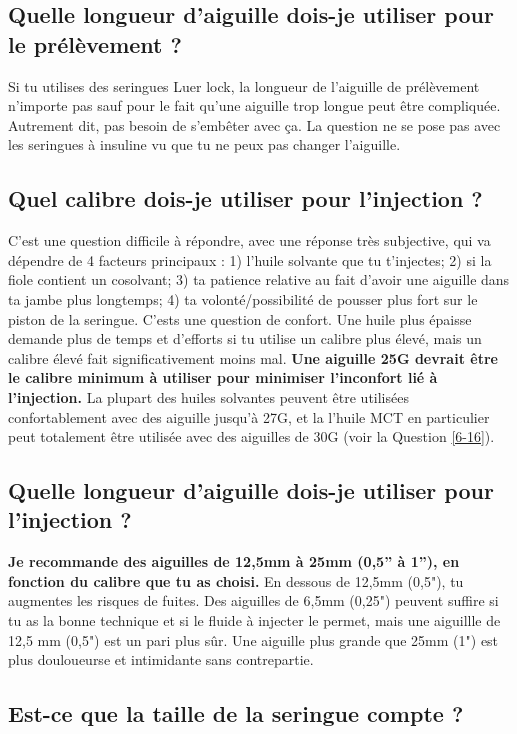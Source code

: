 \documentclass{article}
\begin{document}
\subsection{Quelle longueur d'aiguille dois-je utiliser pour le prélèvement ?}

Si tu utilises des seringues Luer lock, la longueur de l'aiguille de prélèvement n'importe pas sauf pour le fait qu'une aiguille trop longue peut être compliquée. Autrement dit, pas besoin de s'embêter avec ça. La question ne se pose pas avec les seringues à insuline vu que tu ne peux pas changer l'aiguille.

\subsection{Quel calibre dois-je utiliser pour l'injection ?}\label{5-16}

C'est une question difficile à répondre, avec une réponse très subjective, qui va dépendre de 4 facteurs principaux : 1) l'huile solvante que tu t'injectes; 2) si la fiole contient un cosolvant; 3) ta patience relative au fait d'avoir une aiguille dans ta jambe plus longtemps; 4) ta volonté/possibilité de pousser plus fort sur le piston de la seringue. C'ests une question de confort. Une huile plus épaisse demande plus de temps et d'efforts si tu utilise un calibre plus élevé, mais un calibre élevé fait significativement moins mal. \textbf{Une aiguille 25G devrait être le calibre minimum à utiliser pour minimiser l'inconfort lié à l'injection.} La plupart des huiles solvantes peuvent être utilisées confortablement avec des aiguille jusqu'à 27G, et la l'huile MCT en particulier peut totalement être utilisée avec des aiguilles de 30G (voir la Question \ref{6-16}).

\subsection{Quelle longueur d'aiguille dois-je utiliser pour l'injection ?}\label{5-17}

\textbf{Je recommande des aiguilles de 12,5mm à 25mm (0,5” à 1”), en fonction du calibre que tu as choisi.} En dessous de 12,5mm (0,5"), tu augmentes les risques de fuites. Des aiguilles de 6,5mm (0,25") peuvent suffire si tu as la bonne technique et si le fluide à injecter le permet, mais une aiguillle de 12,5 mm (0,5") est un pari plus sûr. Une aiguille plus grande que 25mm (1") est plus douloueurse et intimidante sans contrepartie.

\subsection{Est-ce que la taille de la seringue compte ?}\label{5-18}
\end{document}
